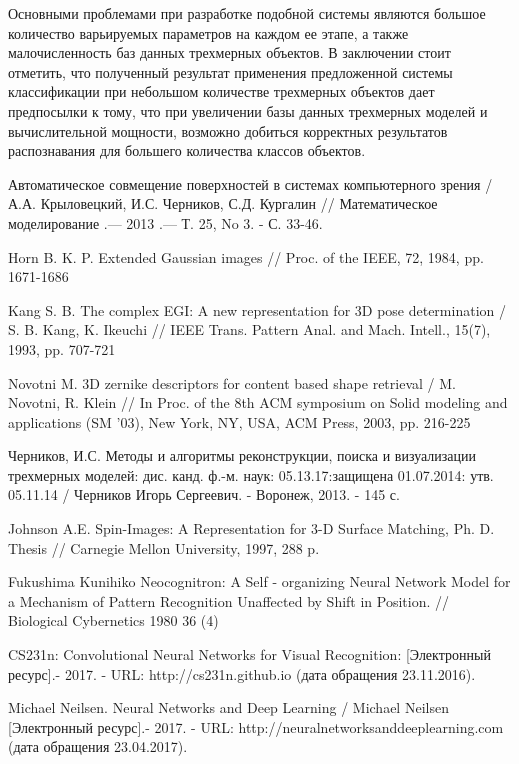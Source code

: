 \documentclass[14pt]{article}
\numberwithin{figure}{section}
\numberwithin{equation}{section}
\begin{document}
Основными проблемами при разработке подобной системы являются большое количество варьируемых параметров на каждом ее этапе, а также малочисленность баз данных трехмерных объектов. В заключении стоит отметить, что полученный результат применения предложенной системы классификации при небольшом количестве трехмерных объектов дает предпосылки к тому, что при увеличении базы данных трехмерных моделей и вычислительной мощности, возможно добиться корректных результатов распознавания для большего количества классов объектов.

\newpage
{}
\begin{thebibliography}{9}

    Автоматическое совмещение поверхностей в системах компьютерного зрения / А.А. Крыловецкий, И.С. Черников, С.Д. Кургалин // Математическое моделирование .— 2013 .— Т. 25, No 3. - С. 33-46.

	Horn B. K. P. Extended Gaussian images // Proc. of the IEEE, 72, 1984, pp. 1671-1686

	Kang S. B. The complex EGI: A new representation for 3D pose determination / S. B. Kang, K. Ikeuchi // IEEE Trans. Pattern Anal. and Mach. Intell., 15(7), 1993, pp. 707-721

	Novotni M. 3D zernike descriptors for content based shape retrieval / M. Novotni, R. Klein // In Proc. of the 8th ACM symposium on Solid modeling and applications (SM ’03), New York, NY, USA, ACM Press, 2003, pp. 216-225

    Черников, И.С. Методы и алгоритмы реконструкции, поиска и визуализации трехмерных моделей: дис. канд. ф.-м. наук: 05.13.17:защищена 01.07.2014: утв. 05.11.14 / Черников Игорь Сергеевич. - Воронеж, 2013. - 145 с.

	Johnson A.E. Spin-Images: A Representation for 3-D Surface Matching, Ph. D. Thesis // Carnegie Mellon University, 1997, 288 p.


	Fukushima Kunihiko Neocognitron: A Self - organizing Neural Network Model for a Mechanism of Pattern Recognition Unaffected by Shift in Position. // Biological Cybernetics 1980 36 (4)

	CS231n: Convolutional Neural Networks for Visual Recognition: [Электронный ресурс].- 2017. - URL: http://cs231n.github.io (дата обращения 23.11.2016).

    Michael Neilsen. Neural Networks and Deep Learning / Michael Neilsen [Электронный ресурс].- 2017. - URL: http://neuralnetworksanddeeplearning.com (дата обращения 23.04.2017).



\end{thebibliography}
\end{document}
